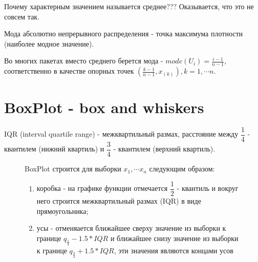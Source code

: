 \documentclass[a4 paper]{article}
\begin{document}
Почему характерным значением называется среднее??? Оказывается, что это не совсем так.

\begin{defin}
Мода абсолютно непрерывного распределения - точка максимума плотности (наиболее модное значение).
\end{defin}

Во многих пакетах вместо среднего берется мода - $mode(U_i) = \frac{i-1}{n-1}$, соответственно в качестве опорных точек $(\frac{k - 1}{n-1}, x_{(k)}), k = 1, \cdots n$.

\section{BoxPlot - box and whiskers}
\begin{defin}
IQR (interval quartile range) - межквартильный размах, расстояние между $\dfrac14$ - квантилем (нижний квартиль) и $\dfrac34$  - квантилем (верхний квартиль). 
\end{defin}

\begin{figure}[h]
\begin{minipage}[h]{0.7\linewidth}
BoxPlot строится для выборки $x_1, \cdots x_n$ следующим образом:
\begin{enumerate}
    \item коробка - на графике функции отмечается $\dfrac12$  - квантиль и вокруг него строится межквартильный размах (IQR) в виде прямоугольника;
    \item усы - отменяается ближайшее сверху значение из выборки к границе $q_{\frac14} - 1.5 * IQR$ и ближайшее снизу значение из выборки к границе $q_{\frac34} + 1.5 * IQR$, эти значения являются концами усов
\end{enumerate}
\end{minipage}
\hfill
\begin{minipage}[h]{0.4\linewidth}
\end{minipage}
\end{figure}
\end{document}
